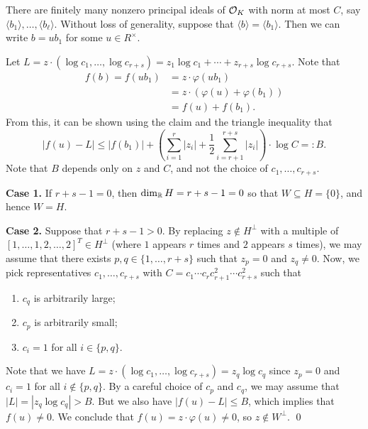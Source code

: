 \begin{pf}
    There are finitely many nonzero principal ideals of ${\cal O}_K$ 
    with norm at most $C$, say $\langle b_1 \rangle, \dots, \langle b_\ell \rangle$. 
    Without loss of generality, suppose that $\langle b \rangle = \langle b_1 \rangle$. 
    Then we can write $b = ub_1$ for some $u \in R^\times$. 
    
    Let $L = z \cdot (\log c_1, \dots, \log c_{r+s}) = z_1 \log c_1 + \cdots + z_{r+s} \log c_{r+s}$. Note that 
    \begin{align*}
        f(b) = f(ub_1) &= z \cdot \varphi(ub_1) \\ 
        &= z \cdot (\varphi(u) + \varphi(b_1)) \\
        &= f(u) + f(b_1). 
    \end{align*}
    From this, it can be shown using the claim and the triangle inequality that 
    \[ |f(u) - L| \leq |f(b_1)| + \left( \sum_{i=1}^r |z_i| + \frac12 \sum_{i=r+1}^{r+s} |z_i| \right) 
    \cdot \log C =: B. \] 
    Note that $B$ depends only on $z$ and $C$, and not the choice of 
    $c_1, \dots, c_{r+s}$.

    {\bf Case 1.} If $r + s - 1 = 0$, then $\dim_{\mathbb{R}} H = r + s - 1 = 0$ 
    so that $W \subseteq H = \{0\}$, and hence $W = H$. 

    {\bf Case 2.} Suppose that $r + s - 1 > 0$. By replacing $z \notin H^\perp$
    with a multiple of $[1, \dots, 1, 2, \dots, 2]^T \in H^\perp$ 
    (where $1$ appears $r$ times and $2$ appears $s$ times), we 
    may assume that there exists $p, q \in \{1, \dots, r+s\}$ such that 
    $z_p = 0$ and $z_q \neq 0$. Now, we pick representatives $c_1, \dots, 
    c_{r+s}$ with $C = c_1 \cdots c_r c_{r+1}^2 \cdots c_{r+s}^2$ such that 
    \begin{enumerate}[(1)]
        \item $c_q$ is arbitrarily large; 
        \item $c_p$ is arbitrarily small; 
        \item $c_i = 1$ for all $i \in \{p, q\}$. 
    \end{enumerate}
    Note that we have $L = z \cdot (\log c_1, \dots, \log c_{r+s}) 
    = z_q \log c_q$ since $z_p = 0$ and $c_i = 1$ for all $i \notin \{p, q\}$. 
    By a careful choice of $c_p$ and $c_q$, we may assume that $|L| = |z_q \log c_q| > B$. 
    But we also have $|f(u) - L| \leq B$, which implies that $f(u) \neq 0$. 
    We conclude that $f(u) = z \cdot \varphi(u) \neq 0$, so $z \notin W^\perp$. \qed 
\end{pf}\newpage  

